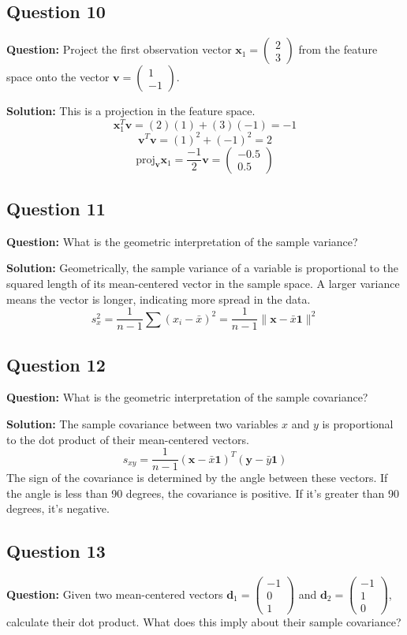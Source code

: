 \subsection*{Question 10}
\textbf{Question:} Project the first observation vector $\mathbf{x}_1 = \begin{pmatrix} 2 \\ 3 \end{pmatrix}$ from the feature space onto the vector $\mathbf{v} = \begin{pmatrix} 1 \\ -1 \end{pmatrix}$.

\textbf{Solution:}
This is a projection in the feature space.
$$ \mathbf{x}_1^T \mathbf{v} = (2)(1) + (3)(-1) = -1 $$
$$ \mathbf{v}^T \mathbf{v} = (1)^2 + (-1)^2 = 2 $$
$$ \text{proj}_{\mathbf{v}} \mathbf{x}_1 = \frac{-1}{2} \mathbf{v} = \begin{pmatrix} -0.5 \\ 0.5 \end{pmatrix} $$

\subsection*{Question 11}
\textbf{Question:} What is the geometric interpretation of the sample variance?

\textbf{Solution:}
Geometrically, the sample variance of a variable is proportional to the squared length of its mean-centered vector in the sample space. A larger variance means the vector is longer, indicating more spread in the data.
$$ s_x^2 = \frac{1}{n-1} \sum (x_i - \bar{x})^2 = \frac{1}{n-1} \|\mathbf{x} - \bar{x}\mathbf{1}\|^2 $$

\subsection*{Question 12}
\textbf{Question:} What is the geometric interpretation of the sample covariance?

\textbf{Solution:}
The sample covariance between two variables $x$ and $y$ is proportional to the dot product of their mean-centered vectors.
$$ s_{xy} = \frac{1}{n-1} (\mathbf{x} - \bar{x}\mathbf{1})^T (\mathbf{y} - \bar{y}\mathbf{1}) $$
The sign of the covariance is determined by the angle between these vectors. If the angle is less than 90 degrees, the covariance is positive. If it's greater than 90 degrees, it's negative.

\subsection*{Question 13}
\textbf{Question:} Given two mean-centered vectors $\mathbf{d}_1 = \begin{pmatrix} -1 \\ 0 \\ 1 \end{pmatrix}$ and $\mathbf{d}_2 = \begin{pmatrix} -1 \\ 1 \\ 0 \end{pmatrix}$, calculate their dot product. What does this imply about their sample covariance?

